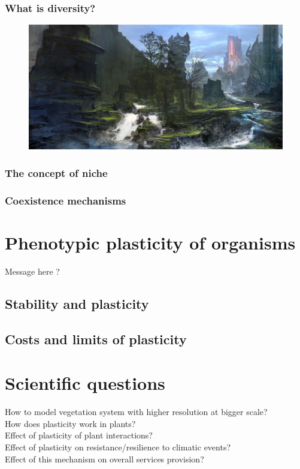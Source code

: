 \subsection{What is diversity?}
\begin{figure}
\includegraphics[scale=1]{./Introduction/graphics/plankton.jpg}
\end{figure}

\subsection{The concept of niche}


\subsection{Coexistence mechanisms}

\chapter{Phenotypic plasticity of organisms}
Message here ?

\section{Stability and plasticity}

\section{Costs and limits of plasticity}


\chapter*{Scientific questions}
How to model vegetation system with higher resolution at bigger scale?\\
How does plasticity work in plants?\\
Effect of plasticity of plant interactions?\\
Effect of plasticity on resistance/resilience to climatic events?\\
Effect of this mechanism on overall services provision?




